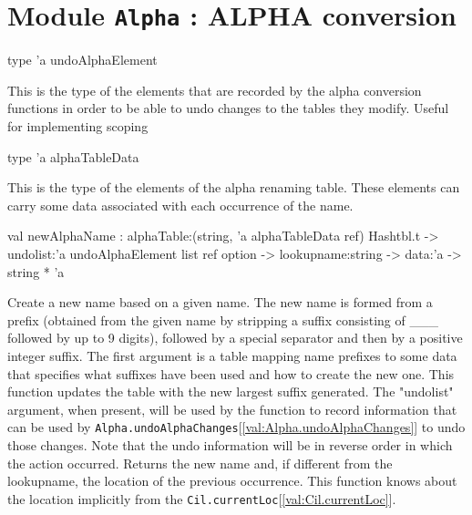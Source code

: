 \documentclass[11pt]{article}
\begin{document}
\section{Module {\tt{Alpha}} : ALPHA conversion}
\label{module:Alpha}




\ocamldocvspace{0.5cm}



\label{type:Alpha.undoAlphaElement}\begin{ocamldoccode}
type 'a undoAlphaElement 
\end{ocamldoccode}
\begin{ocamldocdescription}
This is the type of the elements that are recorded by the alpha 
 conversion functions in order to be able to undo changes to the tables 
 they modify. Useful for implementing 
 scoping


\end{ocamldocdescription}




\label{type:Alpha.alphaTableData}\begin{ocamldoccode}
type 'a alphaTableData 
\end{ocamldoccode}
\begin{ocamldocdescription}
This is the type of the elements of the alpha renaming table. These 
 elements can carry some data associated with each occurrence of the name.


\end{ocamldocdescription}




\label{val:Alpha.newAlphaName}\begin{ocamldoccode}
val newAlphaName :
  alphaTable:(string, 'a alphaTableData ref) Hashtbl.t ->
  undolist:'a undoAlphaElement list ref option ->
  lookupname:string -> data:'a -> string * 'a
\end{ocamldoccode}
\begin{ocamldocdescription}
Create a new name based on a given name. The new name is formed from a 
 prefix (obtained from the given name by stripping a suffix consisting of \_\_\_
 followed by up to 9 digits), followed by a special separator and then by a 
 positive integer suffix. The first argument is a table mapping name 
 prefixes to some data that specifies what suffixes have been used and how 
 to create the new one. This function updates the table with the new 
 largest suffix generated. The "undolist" argument, when present, will be 
 used by the function to record information that can be used by 
 {\tt{Alpha.undoAlphaChanges}}[\ref{val:Alpha.undoAlphaChanges}] to undo those changes. Note that the undo 
 information will be in reverse order in which the action occurred. Returns 
 the new name and, if different from the lookupname, the location of the 
 previous occurrence. This function knows about the location implicitly 
 from the {\tt{Cil.currentLoc}}[\ref{val:Cil.currentLoc}].


\end{ocamldocdescription}
\end{document}
